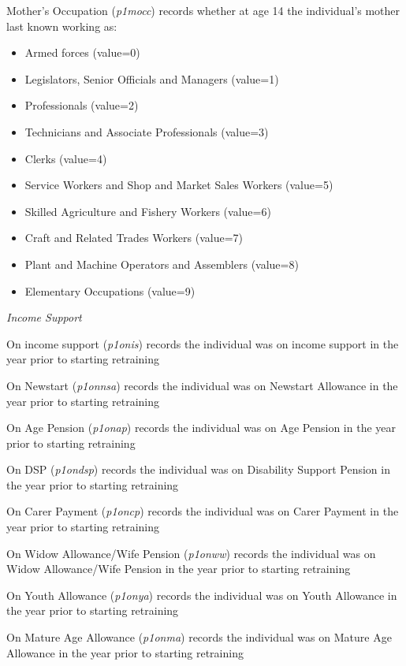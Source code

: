 \documentclass[12pt, a4paper]{article}
\begin{document}
Mother’s Occupation (\textit{p1\textunderscore{}mocc}) records whether at age 14 the individual’s mother last known working as:
\begin{itemize}
  \item Armed forces (value=0)
  \item Legislators, Senior Officials and Managers (value=1)
  \item Professionals (value=2)
  \item Technicians and Associate Professionals (value=3)
  \item Clerks (value=4)
  \item Service Workers and Shop and Market Sales Workers (value=5)
  \item Skilled Agriculture and Fishery Workers (value=6)
  \item Craft and Related Trades Workers (value=7)
  \item Plant and Machine Operators and Assemblers (value=8)
  \item Elementary Occupations (value=9)
\end{itemize}  

\emph{Income Support}

On income support (\textit{p1\textunderscore{}onis}) records the individual was on income support in the year prior to starting retraining

On Newstart (\textit{p1\textunderscore{}onnsa}) records the individual was on Newstart Allowance in the year prior to starting retraining

On Age Pension (\textit{p1\textunderscore{}onap}) records the individual was on Age Pension in the year prior to starting retraining

On DSP (\textit{p1\textunderscore{}ondsp}) records the individual was on Disability Support Pension in the year prior to starting retraining

On Carer Payment (\textit{p1\textunderscore{}oncp}) records the individual was on Carer Payment in the year prior to starting retraining

On Widow Allowance/Wife Pension (\textit{p1\textunderscore{}onww}) records the individual was on Widow Allowance/Wife Pension in the year prior to starting retraining

On Youth Allowance (\textit{p1\textunderscore{}onya}) records the individual was on Youth Allowance in the year prior to starting retraining

On Mature Age Allowance (\textit{p1\textunderscore{}onma}) records the individual was on Mature Age Allowance in the year prior to starting retraining
\end{document}
